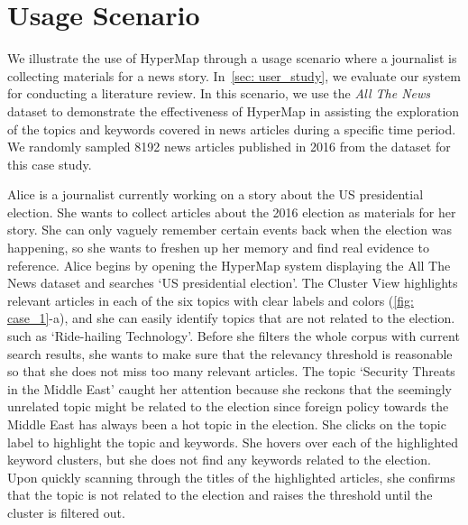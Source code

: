 \section{Usage Scenario}\label{sec: usage_scenario}
We illustrate the use of HyperMap through a usage scenario where a journalist is collecting materials for a news story.
In~\autoref{sec: user_study}, we evaluate our system for conducting a literature review.
In this scenario, we use the \textit{All The News}~\cite{allthenews} dataset to demonstrate the effectiveness of HyperMap in assisting the exploration of the topics and keywords covered in news articles during a specific time period.
We randomly sampled 8192 news articles published in 2016 from the dataset for this case study.

Alice is a journalist currently working on a story about the US presidential election. She wants to collect articles about the 2016 election as materials for her story.
She can only vaguely remember certain events back when the election was happening, so she wants to freshen up her memory and find real evidence to reference.
Alice begins by opening the HyperMap system displaying the All The News dataset and searches `US presidential election'.
The Cluster View highlights relevant articles in each of the six topics with clear labels and colors (\autoref{fig: case_1}-a), and she can easily identify topics that are not related to the election. such as \textcolor{ride_hailing_technology}{`Ride-hailing Technology'}.
Before she filters the whole corpus with current search results, she wants to make sure that the relevancy threshold is reasonable so that she does not miss too many relevant articles.
The topic \textcolor{middle_east_threats}{`Security Threats in the Middle East'} caught her attention because she reckons that the seemingly unrelated topic might be related to the election since foreign policy towards the Middle East has always been a hot topic in the election.
She clicks on the topic label to highlight the topic and keywords.
She hovers over each of the highlighted keyword clusters, but she does not find any keywords related to the election.
Upon quickly scanning through the titles of the highlighted articles, she confirms that the topic is not related to the election and raises the threshold until the cluster is filtered out.


